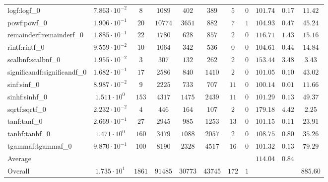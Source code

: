 \begin{tabular}{|l|c|c|c|c|c|c|c|c|c|c|}
logf:logf\_0                 & $ 7.863 \cdot 10^{-2} $ & $ 8      $ & $ 1089  $ & $ 402   $ & $ 389   $ & $ 5   $ & $ 0 $ & $ 101.74      $ & $ 0.17    $ & $ 11.42   $ \\
powf:powf\_0                 & $ 1.906 \cdot 10^{-1} $ & $ 20     $ & $ 10774 $ & $ 3651  $ & $ 882   $ & $ 7   $ & $ 1 $ & $ 104.93      $ & $ 0.47    $ & $ 45.24   $ \\
remainderf:remainderf\_0     & $ 1.885 \cdot 10^{-1} $ & $ 22     $ & $ 1780  $ & $ 628   $ & $ 857   $ & $ 2   $ & $ 0 $ & $ 116.71      $ & $ 1.43    $ & $ 15.16   $ \\
rintf:rintf\_0               & $ 9.559 \cdot 10^{-2} $ & $ 10     $ & $ 1064  $ & $ 342   $ & $ 536   $ & $ 0   $ & $ 0 $ & $ 104.61      $ & $ 0.44    $ & $ 14.84   $ \\
scalbnf:scalbnf\_0           & $ 1.955 \cdot 10^{-2} $ & $ 3      $ & $ 307   $ & $ 132   $ & $ 262   $ & $ 2   $ & $ 0 $ & $ 153.44      $ & $ 3.48    $ & $ 3.43    $ \\
significandf:significandf\_0 & $ 1.682 \cdot 10^{-1} $ & $ 17     $ & $ 2586  $ & $ 840   $ & $ 1410  $ & $ 2   $ & $ 0 $ & $ 101.05      $ & $ 0.10    $ & $ 43.02   $ \\
sinf:sinf\_0                 & $ 8.987 \cdot 10^{-2} $ & $ 9      $ & $ 2225  $ & $ 733   $ & $ 707   $ & $ 11  $ & $ 0 $ & $ 100.14      $ & $ 0.01    $ & $ 11.66   $ \\
sinhf:sinhf\_0               & $ 1.511 \cdot 10^{0}  $ & $ 153    $ & $ 4317  $ & $ 1475  $ & $ 2439  $ & $ 11  $ & $ 0 $ & $ 101.29      $ & $ 0.13    $ & $ 49.37   $ \\
sqrtf:sqrtf\_0               & $ 2.232 \cdot 10^{-2} $ & $ 4      $ & $ 446   $ & $ 164   $ & $ 107   $ & $ 2   $ & $ 0 $ & $ 179.18      $ & $ 4.42    $ & $ 2.25    $ \\
tanf:tanf\_0                 & $ 2.669 \cdot 10^{-1} $ & $ 27     $ & $ 2945  $ & $ 985   $ & $ 1253  $ & $ 13  $ & $ 0 $ & $ 101.15      $ & $ 0.11    $ & $ 23.91   $ \\
tanhf:tanhf\_0               & $ 1.471 \cdot 10^{0}  $ & $ 160    $ & $ 3479  $ & $ 1088  $ & $ 2057  $ & $ 2   $ & $ 0 $ & $ 108.75      $ & $ 0.80    $ & $ 35.26   $ \\
tgammaf:tgammaf\_0           & $ 9.870 \cdot 10^{-1} $ & $ 100    $ & $ 8190  $ & $ 2328  $ & $ 4517  $ & $ 16  $ & $ 0 $ & $ 101.32      $ & $ 0.13    $ & $ 79.29   $ \\
\hline
Average                      & $                     $ & $        $ & $       $ & $       $ & $       $ & $     $ & $   $ & $ 114.04      $ & $ 0.84    $ & $         $ \\
\hline
Overall                      & $ 1.735 \cdot 10^{1}  $ & $ 1861   $ & $ 91485 $ & $ 30773 $ & $ 43745 $ & $ 172 $ & $ 1 $ & $             $ & $         $ & $ 885.60  $ \\
\hline
\end{tabular}
